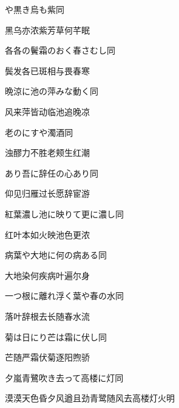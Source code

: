 \begin{haiku}
    {\FH {}や黒き烏も紫}\hfill{\FH 同}

    {\FK 黑乌亦浓紫芳草何芊眠}
\end{haiku}

\begin{haiku}
    {\FH 各各の鬢霜のおく春さむし}\hfill{\FH 同}

    {\FK 鬓发各已斑相与畏春寒}
\end{haiku}

\begin{haiku}
    {\FH 晩涼に池の萍みな動く}\hfill{\FH 同}

    {\FK 风来萍皆动临池追晚凉}
\end{haiku}

\begin{haiku}
    {\FH 老のにすや濁酒}\hfill{\FH 同}

    {\FK 浊醪力不胜老颊生红潮}
\end{haiku}

\begin{haiku}
    {\FH {}あり吾に辞任の心あり}\hfill{\FH 同}

    {\FK 仰见归雁过长愿辞宦游}
\end{haiku}

\begin{haiku}
    {\FH 紅葉濃し池に映りて更に濃し}\hfill{\FH 同}

    {\FK 红叶本如火映池色更浓}
\end{haiku}

\begin{haiku}
    {\FH 病葉や大地に何の病ある}\hfill{\FH 同}

    {\FK 大地染何疾病叶遍尔身}
\end{haiku}

\begin{haiku}
    {\FH 一つ根に離れ浮く葉や春の水}\hfill{\FH 同}

    {\FK 落叶辞根去长随春水流}
\end{haiku}

\begin{haiku}
    {\FH 菊は日にり芒は霜に伏し}\hfill{\FH 同}

    {\FK 芒随严霜伏菊逐阳煦骄}
\end{haiku}

\begin{haiku}
    {\FH 夕嵐青鷺吹き去って高楼に灯}\hfill{\FH 同}

    {\FK 漠漠天色昏夕风遒且劲青鹭随风去高楼灯火明}
\end{haiku}

